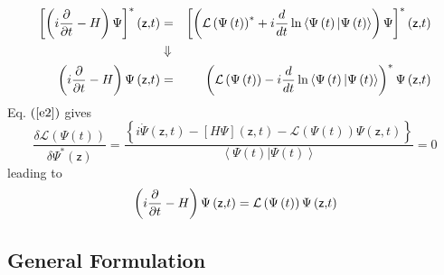 \documentclass[aps,preprint]{revtex4}
\begin{document}
\begin{eqnarray}
\left[ \left( i\frac{\partial }{\partial t}-H\right) \Psi \right] ^{\ast
}\left( \mathsf{z,}t\right) &=&\left[ \left( \mathcal{L}\left( \Psi \left(
t\right) \right) ^{\ast }+i\frac{d}{dt}\ln \left\langle \Psi \left( t\right)
|\Psi \left( t\right) \right\rangle \right) \Psi \right] ^{\ast }\left( 
\mathsf{z,}t\right)  \notag \\
&\Downarrow &  \notag \\
\left( i\frac{\partial }{\partial t}-H\right) \Psi \left( \mathsf{z,}%
t\right) &=&\left( \mathcal{L}\left( \Psi \left( t\right) \right) -i\frac{d}{%
dt}\ln \left\langle \Psi \left( t\right) |\Psi \left( t\right) \right\rangle
\right) ^{\ast }\Psi \left( \mathsf{z,}t\right)
\end{eqnarray}%
Eq. $\left( \ref{e2}\right) $ gives 
\begin{equation}
\frac{\delta \mathcal{L}\left( \Psi \left( t\right) \right) }{\delta \Psi
^{\ast }\left( \mathsf{z}\right) }=\frac{\left\{ i\dot{\Psi}\left( \mathsf{z,%
}t\right) -\left[ H\Psi \right] \left( \mathsf{z,}t\right) -\mathcal{L}%
\left( \Psi \left( t\right) \right) \Psi \left( \mathsf{z,}t\right) \right\} 
}{\left\langle \Psi \left( t\right) |\Psi \left( t\right) \right\rangle }=0
\end{equation}%
leading to 
\begin{equation}
\left( i\frac{\partial }{\partial t}-H\right) \Psi \left( \mathsf{z,}%
t\right) =\mathcal{L}\left( \Psi \left( t\right) \right) \Psi \left( \mathsf{%
z,}t\right)
\end{equation}

\subsection{General Formulation}
\end{document}
